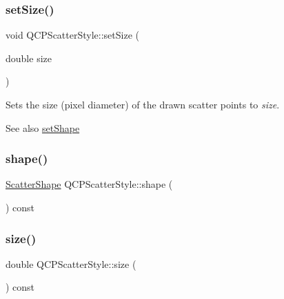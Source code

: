 \subsubsection{\texorpdfstring{setSize()}{setSize()}}
{\footnotesize\ttfamily void Q\+C\+P\+Scatter\+Style\+::set\+Size (\begin{DoxyParamCaption}\item[{double}]{size }\end{DoxyParamCaption})}

Sets the size (pixel diameter) of the drawn scatter points to {\itshape size}.

\begin{DoxySeeAlso}{See also}
\mbox{\hyperlink{class_q_c_p_scatter_style_a7c641c4d4c6d29cb705d3887cfce91c1}{set\+Shape}} 
\end{DoxySeeAlso}
\mbox{\label{class_q_c_p_scatter_style_af04cad55bd7f58a96da4fc6bc46a0a1e}} 
\subsubsection{\texorpdfstring{shape()}{shape()}}
{\footnotesize\ttfamily \mbox{\hyperlink{class_q_c_p_scatter_style_adb31525af6b680e6f1b7472e43859349}{Scatter\+Shape}} Q\+C\+P\+Scatter\+Style\+::shape (\begin{DoxyParamCaption}{ }\end{DoxyParamCaption}) const\hspace{0.3cm}{\ttfamily [inline]}}

\mbox{\label{class_q_c_p_scatter_style_a0e94526d9165d9f50e262102bdd71a47}} 
\subsubsection{\texorpdfstring{size()}{size()}}
{\footnotesize\ttfamily double Q\+C\+P\+Scatter\+Style\+::size (\begin{DoxyParamCaption}{ }\end{DoxyParamCaption}) const\hspace{0.3cm}{\ttfamily [inline]}}

\mbox{\label{class_q_c_p_scatter_style_acabc2a8c83d650b946f50c3166b6c35e}} 
